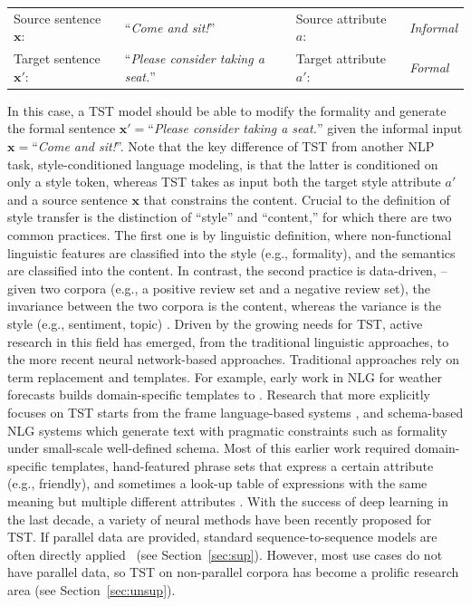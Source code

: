\begin{table}[ht]
    \begin{tabular}{llll}
    Source sentence $\bm{x}$: & ``\textit{Come and sit!}'' & Source attribute $a$: & \textit{Informal}
    \\
    Target sentence $\bm{x}'$: & ``\textit{Please consider taking a seat.}'' & Target attribute $a'$: & \textit{Formal}
    \\
    \end{tabular}
\end{table}
In this case, a TST model should be able to modify the formality and generate the formal sentence $\bm{x}'=$``\textit{Please consider taking a seat.}'' given the informal input $\bm{x}=$``\textit{Come and sit!}''. Note that the key difference of TST from another NLP task, style-conditioned language modeling, is that the latter is conditioned on only a style token, whereas TST takes as input both the target style attribute $a'$ and a source sentence $\bm{x}$ that constrains the content.
Crucial to the definition of style transfer is the distinction of ``style'' and ``content,'' for which there are two common practices. The first one is by linguistic definition, where non-functional linguistic features are classified into the style (e.g., formality), and the semantics are classified into the content. In contrast, the second practice is data-driven, -- given two corpora (e.g., a positive review set and a negative review set), the invariance between the two corpora is the content, whereas the variance is the style (e.g., sentiment, topic) . 
Driven by the growing needs for TST, active research in this field has emerged, from the traditional linguistic approaches, to the more recent neural network-based approaches. Traditional approaches rely on term replacement and templates. For example, early work in NLG for weather forecasts builds domain-specific templates to . Research that more explicitly focuses on TST starts from the frame language-based systems , and schema-based NLG systems  which generate text with pragmatic constraints such as formality under small-scale well-defined schema. Most of this earlier work required domain-specific templates, hand-featured phrase sets that express a certain attribute (e.g., friendly), and sometimes a look-up table of expressions with the same meaning but multiple different attributes .
With the success of deep learning in the last decade, a variety of neural methods have been recently proposed for TST. If parallel data are provided, standard sequence-to-sequence models are often directly applied~ (see Section~\ref{sec:sup}). However, most use cases do not have parallel data, so TST on non-parallel corpora has become a prolific research area (see Section~\ref{sec:unsup}).
